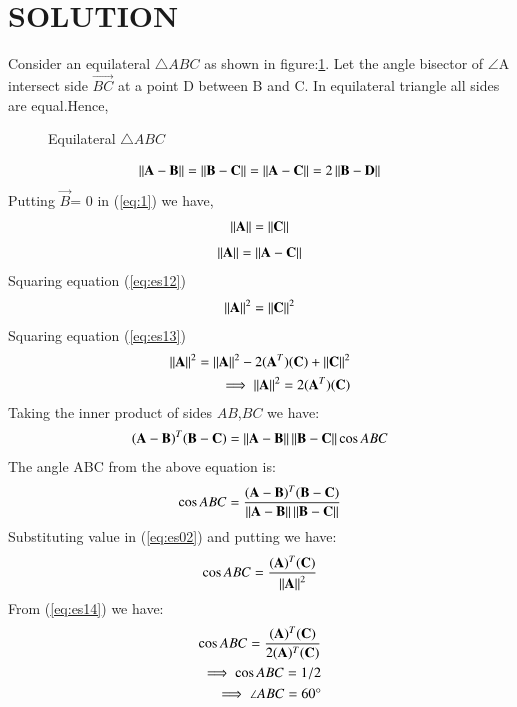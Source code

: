 \documentclass[journal,12pt,twocolumn]{IEEEtran}
\begin{document}
\section{SOLUTION}
Consider an equilateral $\triangle{ABC}$ as shown in figure:\ref{fig:es1}. Let the angle bisector of $\angle$A intersect side $\vec{BC}$ at a point D between B and C.
In equilateral triangle all sides are equal.Hence,
\renewcommand{\thefigure}{1}
\begin{figure}[!ht]
    \centering
    \resizebox{7cm}{!}{}
    \caption{Equilateral $\triangle{ABC}$}
    \label{fig:es1}
\end{figure}
\begin{align}\label{eq:solutions/1/1/11}
\label{eq:1}\left\lVert\mathbf{A-B}\right\rVert=\left\lVert\mathbf{B-C}\right\rVert=\left\lVert\mathbf{A-C}\right\rVert= 2\left\lVert\mathbf{B-D}\right\rVert
\end{align}
Putting $\vec{B}$= 0 in (\ref {eq:1}) we have,
\begin{align}
\label{eq:es12}
\left\lVert\mathbf{A}\right\rVert=\left\lVert\mathbf{C}\right\rVert
\end{align}
\begin{align}
\label{eq:es13}
\left\lVert\mathbf{A}\right\rVert=\left\lVert\mathbf{A-C}\right\rVert
\end{align}
Squaring  equation (\ref{eq:es12})
 \begin{align}
\label{eq:es17}
\left\lVert\mathbf{A}\right\rVert^2=\left\lVert\mathbf{C}\right\rVert^2
\end{align}
Squaring  equation (\ref{eq:es13})
 \begin{align}
\label{eq:es14}
\left\lVert\mathbf{A}\right\rVert^2=\left\lVert\mathbf{A}\right\rVert^2 - 2(\mathbf{A}^T )(\mathbf{C}) +\left\lVert\mathbf{C}\right\rVert^2 \nonumber \\
\implies \left\lVert\mathbf{A}\right\rVert^2=2(\mathbf{A}^T )(\mathbf{C})
\end{align}
Taking the inner product of sides $AB$,$BC$ we have:
\begin{align}
    (\mathbf{A}-\mathbf{B})^T(\mathbf{B}-\mathbf{C}) =
    \left\lVert\mathbf{A}-\mathbf{B}\right\rVert\left\lVert\mathbf{B}-\mathbf{C}\right\rVert\cos{ABC}
\end{align}
The angle ABC from the  above equation is:
\begin{align}\label{eq:es02}
     \cos{ABC} = \frac{(\mathbf{A}-\mathbf{B})^T(\mathbf{B}-\mathbf{C})}{\left\lVert\mathbf{A}-\mathbf{B}\right\rVert\left\lVert\mathbf{B}-\mathbf{C}\right\rVert} 
\end{align}
Substituting value in (\ref{eq:es02}) and putting we have:
\begin{align}\label{eq:es02}
     \cos{ABC} = \frac{(\mathbf{A})^T(\mathbf{C})}{\left\lVert\mathbf{A}\right\rVert^2}
\end{align}
From (\ref{eq:es14}) we have:
\begin{align}\label{eq:es0222}
     \cos{ABC} = \frac{(\mathbf{A})^T(\mathbf{C})}{2(\mathbf{A})^T (\mathbf{C})}\nonumber\\
     \implies \cos{ABC} = 1/2\nonumber\\
\implies \angle {ABC =60 \degree}
\end{align}
\end{document}
